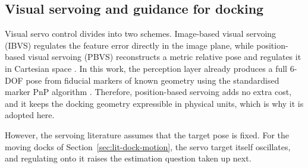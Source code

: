 \subsection{Visual servoing and guidance for docking}

Visual servo control divides into two schemes. Image-based visual servoing (IBVS) regulates the feature error directly in the image plane, while position-based visual servoing (PBVS) reconstructs a metric relative pose and regulates it in Cartesian space \cite{chaumette2006visual}. In this work, the perception layer already produces a full 6-DOF pose from fiducial markers of known geometry using the standardised marker PnP algorithm \cite{garrido2014automatic}. Therefore, position-based servoing adds no extra cost, and it keeps the docking geometry expressible in physical units, which is why it is adopted here.

However, the servoing literature assumes that the target pose is fixed. For the moving docks of Section~\ref{sec:lit-dock-motion}, the servo target itself oscillates, and regulating onto it raises the estimation question taken up next.
